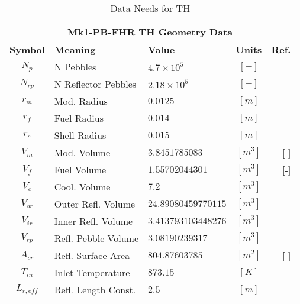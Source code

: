 
\begin{table}[ht!]
\centering
\begin{tabularx}{\textwidth}{|c|l|X|c|r|}
\multicolumn{5}{c}{\textbf{Mk1-PB-FHR TH Geometry Data}}\\
\hline
\textbf{Symbol} & \textbf{Meaning} & \textbf{Value} & \textbf{Units} & \textbf{Ref.} \\
\hline
$N_p$ & N Pebbles & $4.7\times10^5 $ & $[-]$ & \cite{andreades_technical_2014} \\
$N_{rp}$ & N Reflector Pebbles & $2.18\times10^5 $ & $[-]$ & \cite{andreades_technical_2014} \\
$r_m$ & Mod. Radius & $0.0125$ & $[m]$ & \cite{andreades_technical_2014} \\
$r_f$ & Fuel Radius & $0.014$ & $[m]$ & \cite{andreades_technical_2014} \\
$r_s$ & Shell Radius & $0.015$ & $[m]$ & \cite{andreades_technical_2014} \\
$V_m$ & Mod. Volume & $3.8451785083$ & $[m^3]$ & [-] \\
$V_f$ & Fuel Volume & $1.55702044301$ & $[m^3]$ & [-] \\
$V_c$ & Cool. Volume & $7.2$ & $[m^3]$ & \cite{andreades_technical_2014} \\
$V_{or}$ & Outer Refl. Volume & $24.89080459770115$ & $[m^3]$ & \cite{andreades_technical_2014} \\
$V_{ir}$ & Inner Refl. Volume & $3.413793103448276$ & $[m^3]$ & \cite{andreades_technical_2014} \\
$V_{rp}$ & Refl. Pebble Volume & $3.08190239317$ & $[m^3]$ & \cite{andreades_technical_2014} \\
$A_{cr}$ & Refl. Surface Area& $804.87603785$ & $[m^2]$ & [-]\\
$T_{in}$ & Inlet Temperature & $873.15$ & $[K]$ & \cite{andreades_technical_2014} \\
$L_{r,eff}$ & Refl. Length Const. & $2.5$ & $[m]$ & \cite{andreades_technical_2014} \\
\hline
\end{tabularx}
\caption{Data Needs for TH}
\label{tab:th_geom_data}
\end{table}


% 
